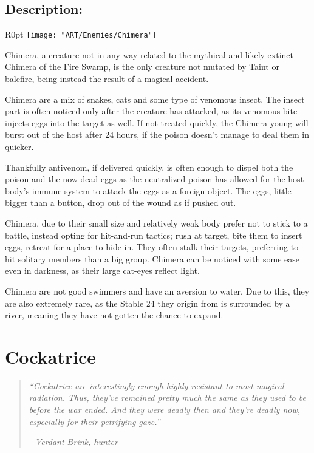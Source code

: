 \documentclass[11pt,a4paper,twocolumn]{book}
\begin{document}
	\subsection*{Description:}
	
	\begin{wrapfigure}{R}{0pt}
		\texttt{[image: "ART/Enemies/Chimera"]}
	\end{wrapfigure}
	
	Chimera, a creature not in any way related to the mythical and likely extinct Chimera of the Fire Swamp, is the only creature not mutated by Taint or balefire, being instead the result of a magical accident.
	
	Chimera are a mix of snakes, cats and some type of venomous insect. The insect part is often noticed only after the creature has attacked, as its venomous bite injects eggs into the target as well. If not treated quickly, the Chimera young will burst out of the host after 24 hours, if the poison doesn't manage to deal them in quicker. 
	
	Thankfully antivenom, if delivered quickly, is often enough to dispel both the poison and the now-dead eggs as the neutralized poison has allowed for the host body's immune system to attack the eggs as a foreign object. The eggs, little bigger than a button, drop out of the wound as if pushed out.
	
	\bigskip
	Chimera, due to their small size and relatively weak body prefer not to stick to a battle, instead opting for hit-and-run tactics; rush at target, bite them to insert eggs, retreat for a place to hide in. They often stalk their targets, preferring to hit solitary members than a big group.
	Chimera can be noticed with some ease even in darkness, as their large cat-eyes reflect light. 
	
	Chimera are not good swimmers and have an aversion to water. Due to this, they are also extremely rare, as the Stable 24 they origin from is surrounded by a river, meaning they have not gotten the chance to expand.
	
	\clearpage
	
	\section*{Cockatrice}
	\begin{quote}
		\emph{``Cockatrice are interestingly enough highly resistant to most magical radiation. Thus, they've remained pretty much the same as they used to be before the war ended. And they were deadly then and they're deadly now, especially for their petrifying gaze.''}
		
		\emph{-	Verdant Brink, hunter}
	\end{quote}
	
\end{document}
